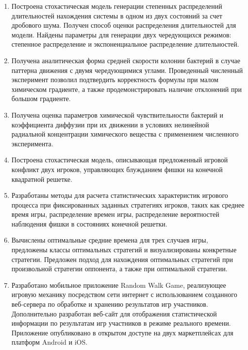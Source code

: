 \begin{enumerate}
  \item Построена стохастическая модель генерации степенных распределений длительностей нахождения системы в одном из двух состояний за счет дробового шума. Получен способ оценки распределения длительностей для модели. Найдены параметры для генерации двух чередующихся режимов: степенное распределение и экспоненциальное распределение длительностей.
  \item Получена аналитическая форма средней скорости колонии бактерий в случае паттерна движения с двумя чередующимися углами. Проведенный численный эксперимент позволил подтвердить корректность формулы при малом химическом градиенте, а также продемонстрировать наличие отклонений при большом градиенте. 
  \item Получена оценка параметров химической чувствительности бактерий и коэффициента диффузии при их движении в условиях нелинейной радиальной концентрации химического вещества с применением численного эксперимента.
  \item Построена стохастическая модель, описывающая предложенный игровой конфликт двух игроков, управляющих блужданием фишки на конечной квадратной решетке. 
  \item Разработаны методы для расчета статистических характеристик игрового процесса при фиксированных заданных стратегиях игроков, таких как среднее время игры, распределение времен игры, распределение вероятностей наблюдения фишки в состояниях конечной решетки. 
  \item Вычислены оптимальные средние времена для трех случаев игры, предложены классы оптимальных стратегий и визуализированы конкретные стратегии. Предложен подход для нахождения оптимальных стратегий при произвольной стратегии оппонента, а также при оптимальной стратегии.
  \item Разработано мобильное приложение Random Walk Game, реализующее игровую механику посредством сети интернет с использованием созданного веб-сервера по обработке и хранению результатов игр участников. Дополнительно разработан веб-сайт для отображения статистической информации по результатам игр участников в режиме реального времени. Приложение опубликовано в открытом доступе на двух маркетплейсах для платформ Android и iOS.

\end{enumerate}
